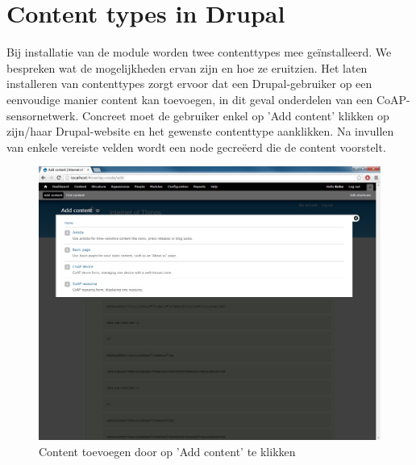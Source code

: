 \section{Content types in Drupal}

Bij installatie van de module worden twee contenttypes mee ge\"{i}nstalleerd. We bespreken wat de mogelijkheden ervan zijn en hoe ze eruitzien. Het laten installeren van contenttypes zorgt ervoor dat een Drupal-gebruiker op een eenvoudige manier content kan toevoegen, in dit geval onderdelen van een CoAP-sensornetwerk. Concreet moet de gebruiker enkel op 'Add content' klikken op zijn/haar Drupal-website en het gewenste contenttype aanklikken. Na invullen van enkele vereiste velden wordt een node gecre\"{e}erd die de content voorstelt.
\begin{figure}[h!]
\vspace{10pt}
\centering
\includegraphics[width=1\textwidth]{fig/add_content}
\caption{Content toevoegen door op 'Add content' te klikken}
\label{fig:addContent}
\end{figure}

